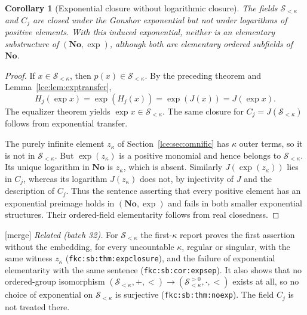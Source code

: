 \documentclass[11pt,letterpaper]{article}
\numberwithin{equation}{section}
\newtheorem{corollary}[theorem]{Corollary}
\theoremstyle{definition}
\theoremstyle{remark}
\newcommand{\No}{\mathbf{No}}
\newcommand{\Sk}{\mathscr S_{<\kappa}}
\newcommand{\Common}{C_j}
\newcommand{\leref}[1]{Lemma~\ref{#1}}
\newcommand{\mergetag}{\textup{\textsf{\small[merge]}}}%
\newcommand{\lbl}[1]{\nolinkurl{#1}}%
\begin{document}
\begin{corollary}[Exponential closure without logarithmic closure]\label{lce:cor:expclosure}
The fields $\Sk$ and $\Common$ are closed under the Gonshor exponential
but not under logarithms of positive elements. With this induced
exponential, neither is an elementary substructure of $(\No,\exp)$,
although both are elementary ordered subfields of $\No$.
\end{corollary}
\begin{proof}
If $x\in\Sk$, then $p(x)\in\Sk$. By the preceding theorem and
\leref{lce:lem:exptransfer},
\[
 H_j(\exp x)=\exp(H_j(x))=\exp(J(x))=J(\exp x).
\]
The equalizer theorem yields $\exp x\in\Sk$. The same closure for
$\Common=J(\Sk)$ follows from exponential transfer.

The purely infinite element $z_\kappa$ of Section~\ref{lce:sec:omnific} has
$\kappa$ outer terms, so it is not in $\Sk$. But $\exp(z_\kappa)$ is
a positive monomial and hence belongs to $\Sk$. Its unique logarithm
in $\No$ is $z_\kappa$, which is absent. Similarly
$J(\exp(z_\kappa))$ lies in $\Common$, whereas its logarithm
$J(z_\kappa)$ does not, by injectivity of $J$ and the description of
$\Common$. Thus the sentence asserting that every positive element has
an exponential preimage holds in $(\No,\exp)$ and fails in both smaller
exponential structures. Their ordered-field elementarity follows from
real closedness.
\end{proof}
\mergetag{} \emph{Related (batch 32).} For $\Sk$ the first-$\kappa$ report
proves the first assertion without the embedding, for every uncountable
$\kappa$, regular or singular, with the same witness $z_\kappa$
(\lbl{fkc:sb:thm:expclosure}), and the failure of exponential elementarity
with the same sentence (\lbl{fkc:sb:cor:expsep}). It also shows that no
ordered-group isomorphism $(\Sk,+,<)\to(\Sk^{>0},\cdot,<)$ exists at all, so
no choice of exponential on $\Sk$ is surjective
(\lbl{fkc:sb:thm:noexp}). The field $\Common$ is not treated there.
\end{document}
